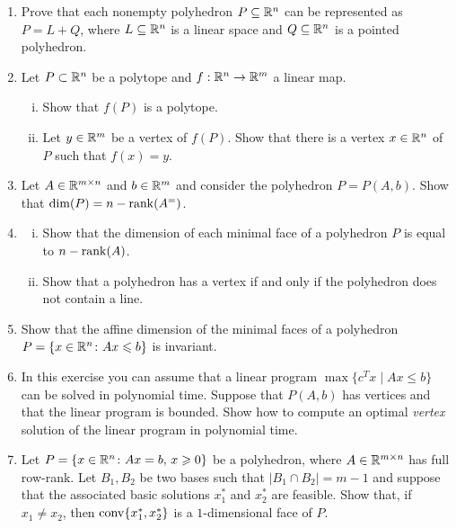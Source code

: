 \begin{enumerate}[1)]
Write $v$ as a conic combination using only three vectors of the $x_i$.

\emph{Hint: Recall the proof of Carath\'eodory's theorem}

\item 
  Prove that each nonempty  polyhedron $P\subseteq\mathbb{R}^n$ can be represented as $ P = L + Q$,
  where  $L\subseteq\mathbb{R}^n$ is a linear space and $Q\subseteq\mathbb{R}^n$ is a pointed
  polyhedron.   \label{po:ex:1}
\item Let $P\subset\mathbb{R}^n$ be a polytope and $f:\mathbb{R}^n\to\mathbb{R}^m$ a linear map. 
  \begin{enumerate}[i)]
  \item Show that $f(P)$ is a polytope.
  \item Let $y\in\mathbb{R}^m$ be a vertex of $f(P)$. Show that there is a vertex $x\in\mathbb{R}^n$ of $P$
    such that $f(x) = y$.
  \end{enumerate}
\item 
  Let $A \in \mathbb{R}^{m\times n}$ and $b \in \mathbb{R}^m$ and consider the polyhedron
  $P = P(A,b)$. Show that $\dim(P) = n - \mathrm{rank}(A^=)$.   \label{po:ex:2}
\item 
  \begin{enumerate}[i)]
  \item 
  Show that the dimension of each minimal face of a polyhedron $P$ is
  equal to $n - \mathrm{rank}(A)$. 
  \item
  Show that a polyhedron has a vertex if and only if the polyhedron
  does not contain a line. 
\end{enumerate}   \label{po:ex:3}
\item Show that the affine  dimension of the minimal faces of a 
  polyhedron $P = \{x \in \mathbb{R}^n \colon Ax\leqslant b\}$ is invariant. \label{item:19}
\item 
  In this exercise you can assume that a linear program $\max\{c^Tx \mid
  Ax\leq b \}$ can be solved in polynomial time. Suppose that $P(A,b)$
  has vertices and that the linear program is bounded. Show how to
  compute an optimal \emph{vertex} solution of the linear
  program in polynomial time.    \label{po:ex:4}
\item  Let $P = \{x \in \mathbb{R}^n \colon Ax = b, \, x\geqslant0\}$ be a polyhedron,
  where $A \in \mathbb{R}^{m\times n}$ has full row-rank. Let $B_1,B_2$ be two bases
  such that $|B_1\cap B_2| = m-1$ and suppose that the associated basic
  solutions $x^*_1$ and $x^*_2$ are feasible. Show that, if
  $x_1\neq x_2$, then   $\operatorname{conv}\{x_1^*,x_2^*\}$ is a $1$-dimensional face
  of $P$. \label{item:co18} 


\end{enumerate}








% 

% 


